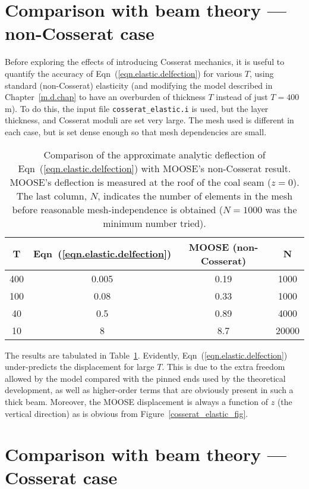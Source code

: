 \documentclass[]{scrreprt}
\begin{document}
\section{Comparison with beam theory --- non-Cosserat case}

Before
exploring the effects of introducing Cosserat mechanics, it is useful
to quantify the accuracy of Eqn~(\ref{eqn.elastic.delfection}) for
various $T$, using standard (non-Cosserat) elasticity (and modifying
the model described in Chapter~\ref{m.d.chap} to have an overburden of
thickness $T$ instead of just $T=400$\,m).    To do this,
the input file {\tt cosserat\_elastic.i} is used, but the layer
thickness, and Cosserat moduli are set very large.  The mesh used is
different in each case, but is set dense enough so that mesh
dependencies are small.

\begin{table}[htb]
\begin{center}
\begin{tabular}{cccc}
  T & Eqn~(\ref{eqn.elastic.delfection}) & MOOSE (non-Cosserat) & N \\
  \hline
  400 & 0.005 & 0.19 & 1000 \\
  100 & 0.08 & 0.33 & 1000 \\
  40 & 0.5 & 0.89 & 4000 \\
  10 & 8 & 8.7 & 20000\\
\end{tabular}
\caption{Comparison of the approximate analytic deflection of
  Eqn~(\ref{eqn.elastic.delfection}) with MOOSE's non-Cosserat
  result.  MOOSE's deflection is measured at the roof of the coal seam
  ($z=0$).  The last column, $N$, indicates the number of elements in
  the mesh before reasonable mesh-independence is obtained  ($N=1000$ was the
  minimum number tried).}
\label{elastic.deform.standard}
\end{center}
\end{table}

The results are tabulated in Table~\ref{elastic.deform.standard}.
Evidently, Eqn~(\ref{eqn.elastic.delfection}) under-predicts the
displacement for large $T$.  This is due to the extra freedom allowed
by the model compared with the pinned ends used by the theoretical
development, as well as higher-order terms that are obviously present
in such a thick beam.  Moreover, the MOOSE displacement is always a
function of $z$ (the vertical direction) as is obvious from
Figure~\ref{cosserat_elastic_fig}.

\section{Comparison with beam theory --- Cosserat case}
\end{document}
